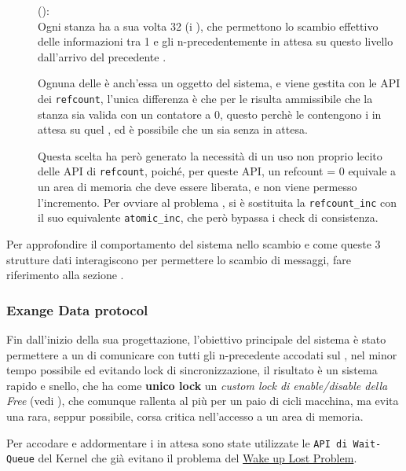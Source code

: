 \begin{description}
\item[\Topic] (\exangeRoom):\\
Ogni stanza ha a sua volta 32 \exangeRoom (i \Topic), che permettono lo scambio effettivo delle informazioni
tra 1 \Writer e gli n-\Reader precedentemente in attesa su questo livello dall'arrivo del precedente \Writer.

Ognuna delle \exangeRoom è anch'essa un oggetto del sistema, e viene gestita con le API dei \texttt{refcount},
l'unica differenza è che per le \exangeRoom risulta ammissibile che la stanza sia valida con un contatore a 0,
questo perchè le \exangeRoom contengono i \Reader in attesa su quel \Topic, ed è possibile che un \Topic sia
senza \Reader in attesa.

Questa scelta ha però generato la necessità di un uso non proprio lecito delle API di \texttt{refcount},
poiché, per queste API, un refcount = 0 equivale a un area di memoria che deve essere liberata, e non viene permesso
l'incremento. Per ovviare al problema , si è sostituita la \verb|refcount_inc| con il suo equivalente
\verb|atomic_inc|, che però bypassa i check di consistenza.
\end{description}

\begin{footnotesize}
Per approfondire il comportamento del sistema nello scambio e come queste 3 strutture dati interagiscono per permettere
lo scambio di messaggi, fare riferimento alla sezione .
\end{footnotesize}

\newpage

\subsubsection{Exange Data protocol} \label{exangeDataProtocol}

Fin dall'inizio della sua progettazione, l'obiettivo principale del sistema è stato permettere a un \Writer di
comunicare con tutti gli n-\Reader precedente accodati sul \Topic, nel minor tempo possibile ed evitando lock
di sincronizzazione, il risultato è un sistema rapido e snello, che ha come \textbf{unico lock} un \textit{custom lock
di enable/disable della Free} (vedi ), che comunque rallenta al più per un paio di cicli
macchina, ma evita una rara, seppur possibile, corsa critica nell'accesso a un area di memoria.

Per accodare e addormentare i \Reader in attesa sono state utilizzate le  \texttt{API di Wait-Queue} del Kernel che già
evitano il problema del \underline{Wake up Lost Problem}.

